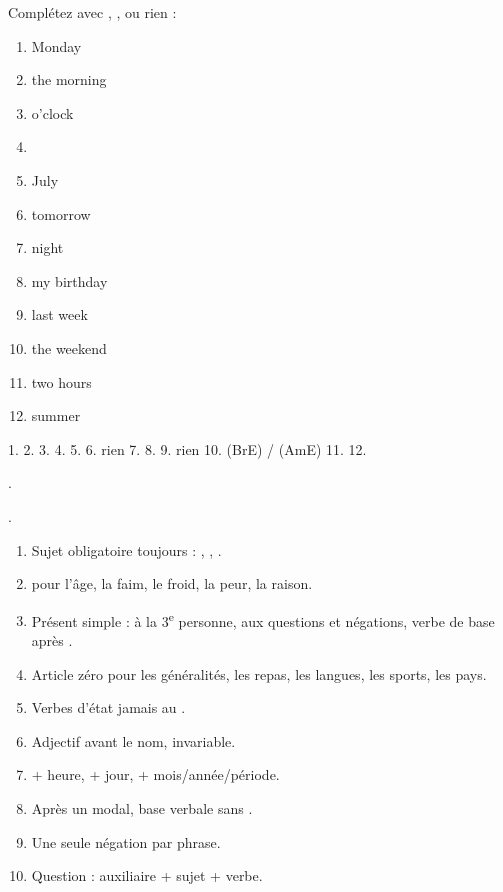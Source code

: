 \begin{exo}
Complétez avec , ,  ou rien :
\begin{enumerate}
  \item \trou[1cm] Monday \item \trou[1cm] the morning \item {} o'clock
  \item {} \item \trou[1cm] July \item \trou[1cm] tomorrow
  \item \trou[1cm] night \item \trou[1cm] my birthday \item \trou[1cm] last week
  \item \trou[1cm] the weekend \item \trou[1cm] two hours \item \trou[1cm] summer
\end{enumerate}
\end{exo}
\begin{corrige}[11.1]
1.  2.  3.  4.  5.  6. rien 7. 
8.  9. rien 10.  (BrE) /  (AmE) 11.  12. 
\end{corrige}

\begin{exo}
.
\end{exo}
\begin{corrige}[11.2]
.
\end{corrige}

\begin{memo}
\begin{enumerate}
  \item Sujet obligatoire toujours : , , .
  \item {} pour l'âge, la faim, le froid, la peur, la raison.
  \item Présent simple :  à la 3\textsuperscript{e} personne,  aux questions
  et négations, verbe de base après .
  \item Article zéro pour les généralités, les repas, les langues, les sports, les pays.
  \item Verbes d'état jamais au .
  \item Adjectif avant le nom, invariable.
  \item {} + heure,  + jour,  + mois/année/période.
  \item Après un modal, base verbale sans .
  \item Une seule négation par phrase.
  \item Question : auxiliaire + sujet + verbe.
\end{enumerate}
\end{memo}
